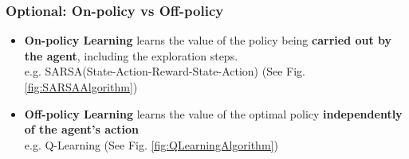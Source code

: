 \documentclass{beamer}
\begin{document}
    \begin{frame}
      \frametitle{Optional: On-policy vs Off-policy}
      \begin{itemize}
        \item \textbf{On-policy Learning} learns the value of the policy being \textbf{carried out by the agent}, including the exploration steps. \\
              e.g. SARSA(State-Action-Reward-State-Action) (See Fig. \ref{fig:SARSAAlgorithm})
        \item \textbf{Off-policy Learning} learns the value of the optimal policy \textbf{independently of the agent's action} \\
              e.g. Q-Learning (See Fig. \ref{fig:QLearningAlgorithm})
      \end{itemize}
    \end{frame}
\end{document}
